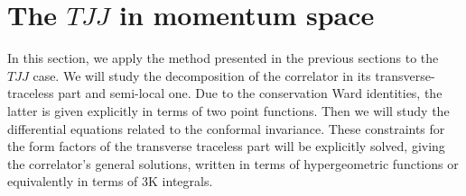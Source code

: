 \documentclass[a4paper,11pt,openright,twoside]{book}
\numberwithin{equation}{section}
\begin{document}
{{{%
\section{The \texorpdfstring{$TJJ$}{} in momentum space}\label{TJJmom}
In this section, we apply the method presented in the previous sections to the $TJJ$ case. We will study the decomposition of the correlator in its transverse-traceless part and semi-local one. Due to the conservation Ward identities, the latter is given explicitly in terms of two point functions. Then we will study the differential equations related to the conformal invariance. These constraints for the form factors of the transverse traceless part will be explicitly solved, giving the correlator's general solutions, written in terms of hypergeometric functions or equivalently in terms of $3$K integrals. 

}}}
\end{document}

